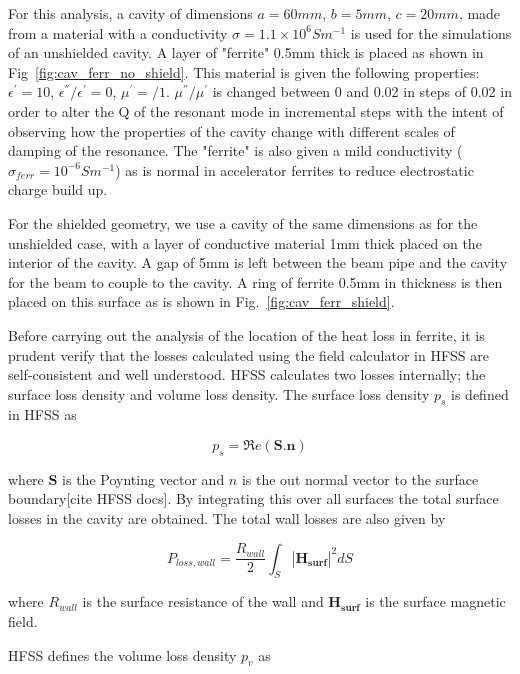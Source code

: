 For this analysis, a cavity of dimensions $a=60mm$, $b=5mm$, $c=20mm$, made from a material with a conductivity $\sigma = 1.1 \times 10^{6} S m^{-1}$ is used for the simulations of an unshielded cavity. A layer of "ferrite" 0.5mm thick is placed as shown in Fig~\ref{fig:cav_ferr_no_shield}. This material is given the following properties: $\epsilon^{'} = 10$, $\epsilon^{''}/\epsilon^{'} = 0$, $\mu^{'}=/1$. $\mu^{''}/ \mu^{'}$ is changed between 0 and 0.02 in steps of 0.02 in order to alter the Q of the resonant mode in incremental steps with the intent of observing how the properties of the cavity change with different scales of damping of the resonance. The "ferrite" is also given a mild conductivity ($\sigma_{ferr} = 10^{-6} S m^{-1}$) as is normal in accelerator ferrites to reduce electrostatic charge build up. 

For the shielded geometry, we use a cavity of the same dimensions as for the unshielded case, with a layer of conductive material 1mm thick placed on the interior of the cavity. A gap of 5mm is left between the beam pipe and the cavity for the beam to couple to the cavity. A ring of ferrite 0.5mm in thickness is then placed on this surface as is shown in Fig.~\ref{fig:cav_ferr_shield}.

Before carrying out the analysis of the location of the heat loss in ferrite, it is prudent verify that the losses calculated using the field calculator in HFSS are self-consistent and well understood. HFSS calculates two losses internally; the surface loss density and volume loss density. The surface loss density $p_{s}$ is defined in HFSS as

\begin{equation}
p_{s} = \Re{}e \left( \mathbf{S}.\mathbf{n} \right)
\end{equation}

where $\mathbf{S}$ is the Poynting vector and $n$ is the out normal vector to the surface boundary[cite HFSS docs]. By integrating this over all surfaces the total surface losses in the cavity are obtained. The total wall losses are also given by 

\begin{equation}
P_{loss, wall} = \frac{R_{wall}}{2} \int_{S} \left| \mathbf{H_{surf}} \right|^{2} dS
\label{eqn:wall_losses}
\end{equation}

where $R_{wall}$ is the surface resistance of the wall and $\mathbf{H_{surf}}$ is the surface magnetic field.

HFSS defines the volume loss density $p_{v}$ as 

